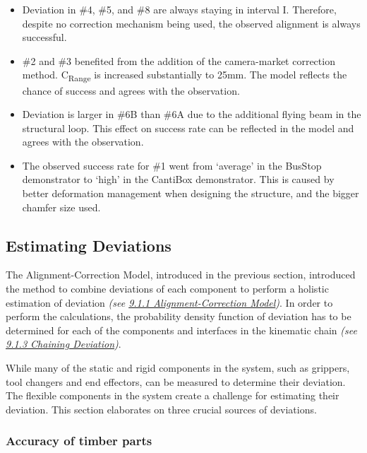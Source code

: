 \documentclass[11pt]{book}
\begin{document}
\begin{itemize}
	\item Deviation in $\#$4, $\#$5, and $\#$8 are always staying in interval I. Therefore, despite no correction mechanism being used, the observed alignment is always successful. 

	\item $\#$2 and $\#$3 benefited from the addition of the camera-market correction method. C\textsubscript{Range} is increased substantially to 25mm. The model reflects the chance of success and agrees with the observation.

	\item Deviation is larger in $\#$6B than $\#$6A due to the additional flying beam in the structural loop. This effect on success rate can be reflected in the model and agrees with the observation.

	\item The observed success rate for $\#$1 went from ‘average’ in the BusStop demonstrator to ‘high’ in the CantiBox demonstrator. This is caused by better deformation management when designing the structure, and the bigger chamfer size used. 

\end{itemize}
\vspace{1\baselineskip}
\subsection{Estimating Deviations}

The Alignment-Correction Model, introduced in the previous section, introduced the method to combine deviations of each component to perform a holistic estimation of deviation \textit{(see \uline{9.1.1 Alignment-Correction Model})}. In order to perform the calculations, the probability density function of deviation has to be determined for each of the components and interfaces in the kinematic chain \textit{(see \uline{9.1.3 Chaining Deviation})}.

While many of the static and rigid components in the system, such as grippers, tool changers and end effectors, can be measured to determine their deviation. The flexible components in the system create a challenge for estimating their deviation. This section elaborates on three crucial sources of deviations.

\subsubsection{Accuracy of timber parts}
\end{document}
